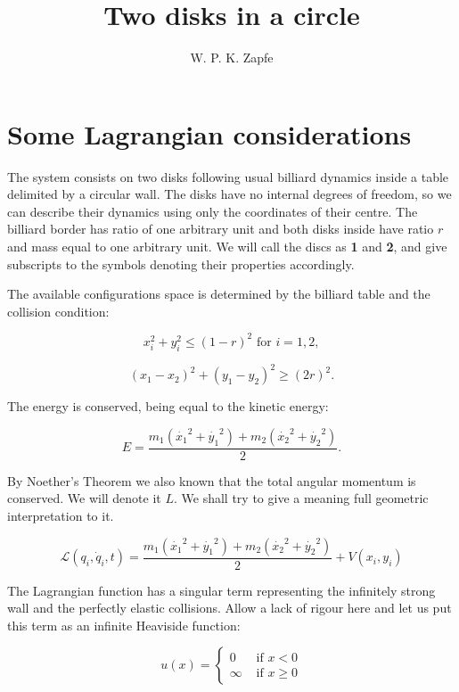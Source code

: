 \documentclass[letterpaperr,12pt]{article}
\title{Two disks in a circle}
\author{W. P. K. Zapfe}
\newcommand{\Lagr}{\mathcal{L}\xspace}
\newcommand{\Uno}{\textbf{1}\xspace}
\newcommand{\Dos}{\textbf{2}\xspace}
\begin{document}
\section{Some Lagrangian considerations}

The system consists on two disks following usual billiard dynamics 
\cite{markchern} inside
a table delimited by a circular wall. The disks have no internal degrees
of freedom, so we can describe their dynamics using only the coordinates 
of their centre.
The billiard border has ratio of one arbitrary unit 
and both disks inside have ratio
$r$ and  mass equal to one arbitrary unit. We will call the discs as
\Uno and \Dos, and give subscripts to the symbols denoting
their properties
accordingly.

The available  configurations space is determined by the billiard
table and the collision condition:

\begin{equation}
x_i^2+y_i^2 \leq (1-r)^2 \text{ for } i=1,2,
\end{equation}

\begin{equation}
(x_1-x_2)^2+(y_1-y_2)^2 \geq (2r)^2.
\end{equation}
 
The energy is conserved, being equal to the kinetic energy:

\begin{equation}
E=\frac{m_1(\dot{x_1}^2+\dot{y_1}^2)+m_2(\dot{x_2}^2+\dot{y_2}^2)}{2}.
\end{equation}

By Noether's Theorem we also known that the total angular momentum is conserved.
We will denote it $L$. We shall try to give a meaning full geometric interpretation
to it.

\begin{equation}
\Lagr (q_i,\dot{q}_i,t) 
=\frac{m_1(\dot{x_1}^2+\dot{y_1}^2)+m_2(\dot{x_2}^2+\dot{y_2}^2)}{2}
+V(x_i, y_i)
\end{equation}

 The Lagrangian function has a singular term
 representing the infinitely strong wall and the perfectly
elastic collisions. Allow a lack of rigour here and let us
put this term as an infinite Heaviside function: 

\begin{equation}
u(x)=\begin{cases}
0 &\mbox{ if } x < 0 \\
\infty &\mbox{ if } x \ge 0 
\end{cases}
\end{equation}
\end{document}
